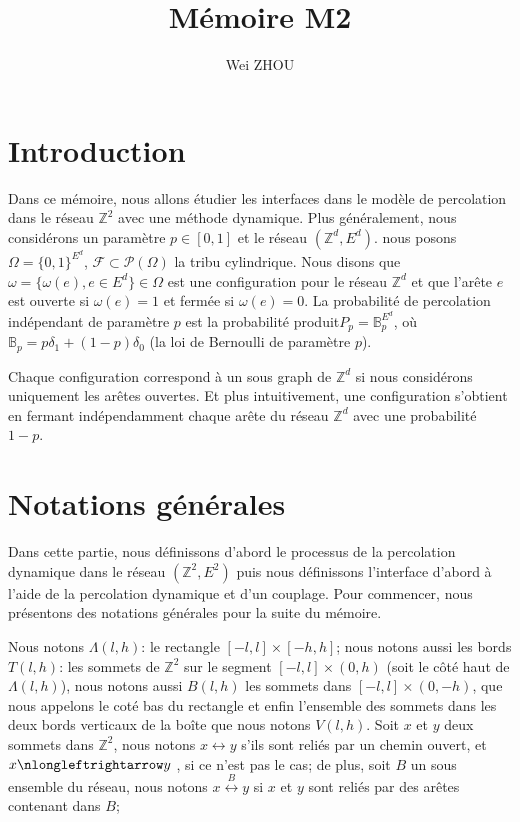 \documentclass[titlepage,a4paper,12pt]{article}
\title{Mémoire M2}
\author{Wei ZHOU}
\newcounter{cor}
\begin{document}
\maketitle

\section{Introduction}
Dans ce mémoire, nous allons étudier les interfaces dans le modèle de percolation dans le réseau $\mathbb{Z}^2$ avec une méthode dynamique. Plus généralement, nous considérons un paramètre $p\in [0,1]$ et le réseau $(\mathbb{Z}^d,E^d)$. nous posons $\Omega = \{0,1\}^{E^d}$, $\mathcal{F}\subset \mathcal{P}(\Omega)$ la tribu cylindrique. Nous disons que $\omega = \{\omega(e), e\in E^d\} \in \Omega$ est une configuration pour le réseau $\mathbb{Z}^d$ et que l'arête $e$ est ouverte si $\omega(e) = 1$ et fermée si $\omega(e)= 0$. La probabilité de percolation indépendant de paramètre $p$ est la probabilité produit$P_p = \mathbb{B}_p^{E^d}$, où $\mathbb{B}_p = p\delta_1 +(1-p)\delta_0 $ (la loi de Bernoulli de paramètre $p$).

Chaque configuration correspond à un sous graph de $\mathbb{Z}^d$ si nous considérons uniquement les arêtes ouvertes. Et plus intuitivement, une configuration s'obtient en fermant indépendamment chaque arête du réseau $\mathbb{Z}^d$ avec une probabilité $1-p$. 

\section{Notations générales}
Dans cette partie, nous définissons d'abord le processus de la percolation dynamique dans le réseau $(\mathbb{Z}^2,E^2)$ puis nous définissons l'interface d'abord à l'aide de la percolation dynamique et d'un couplage. Pour commencer, nous présentons des notations générales pour la suite du mémoire.

Nous notons $\Lambda(l,h)$: le rectangle $[-l,l]\times[-h,h]$;  nous notons aussi les bords $T(l,h)$: les sommets de $\mathbb{Z}^2$ sur le segment $[-l,l]\times(0,h)$ (soit le côté haut de $\Lambda(l,h)$), nous notons aussi $B(l,h)$ les sommets dans $[-l,l]\times(0,-h)$, que nous appelons le coté bas du rectangle et enfin l'ensemble des sommets dans les deux bords verticaux de la boîte que nous notons $V(l,h)$. Soit $x$ et $y$ deux sommets dans $\mathbb{Z}^2$, nous notons $x\longleftrightarrow y$ s'ils sont reliés par un chemin ouvert, et $x\nlongleftrightarrow y$ , si ce n'est pas le cas; de plus, soit $B$ un sous ensemble du réseau, nous notons $x\overset{B}{\longleftrightarrow} y$ si $x$ et $y$ sont reliés par des arêtes contenant dans $B$;
\end{document}

